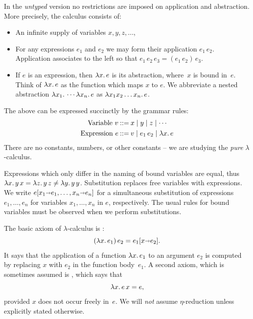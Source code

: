 In the \emph{untyped} version no restrictions are imposed on
application and abstraction. More precisely, the calculus consists of:
%
\begin{itemize}
\item An infinite supply of variables $x, y, z, \ldots$,
\item For any expressions $e_1$ and $e_2$ we may form their
  application $e_1\, e_2$. Application associates to the left so that
  $e_1\, e_2\, e_3 = (e_1\, e_2)\, e_3$.
\item If $e$ is an expression, then $\lambda x .\,e$ is its abstraction,
  where~$x$ is bound in~$e$. Think of $\lambda x .\,e$ as the function
  which maps $x$ to $e$. We abbreviate a nested abstraction
  $\lambda x_1 .\,\cdots \lambda x_n .\,e$ as $\lambda x_1 x_2 \ldots x_n .\,e$.
\end{itemize}
%
The above can be expressed succinctly by the grammar rules:
%
\begin{align*}
  \text{Variable}\ v &\mathbin{{:}{:}{=}} x \mid y \mid z \mid \cdots \\
  \text{Expression}\ e &\mathbin{{:}{:}{=}} v \mid e_1\,e_2 \mid \lambda x .\,e
\end{align*}
%
There are no constants, numbers, or other constants -- we are studying the \emph{pure} $\lambda$-calculus.

Expressions which only differ in the naming of bound variables are
equal, thus $\lambda x .\,y\, x = \lambda z .\,y\, z \neq \lambda y .\,y\,
  y$. Substitution replaces free variables with expressions. We write
$e[x_1 {\shortrightarrow} e_1, \ldots, x_n {\shortrightarrow} e_n]$ for a
simultaneous substitution of expressions $e_1, \ldots, e_n$ for
variables $x_1, \ldots, x_n$ in $e$, respectively. The usual rules for
bound variables must be observed when we perform
substitutions.

The basic axiom of $\lambda$-calculus is :
%
\begin{equation*}
  (\lambda x .\,e_1)\, e_2 = e_1[x {\shortrightarrow} e_2].
\end{equation*}
%
It says that the application of a function $\lambda x .\,e_1$ to an
argument $e_2$ is computed by replacing $x$ with $e_2$ in the function
body~$e_1$. A second axiom, which is sometimes assumed is
, which says that
%
\begin{equation*}
  \lambda x .\,e\, x = e,
\end{equation*}
%
provided $x$ does not occur freely in~$e$. We will \emph{not} assume
$\eta$-reduction unless explicitly stated otherwise.

